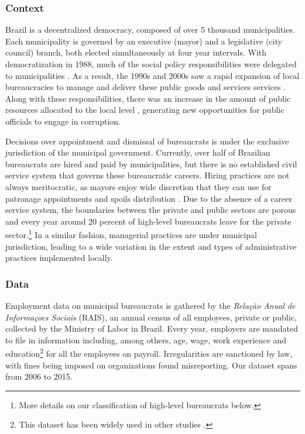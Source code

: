 \subsubsection*{Context}

Brazil is a decentralized democracy, composed of over 5 thousand municipalities. Each municipality is governed by an executive (mayor) and a legislative (city council) branch, both elected simultaneously at four year intervals. With democratization in 1988, much of the social policy responsibilities were delegated to  municipalities \citep{abrucio_redefinicao_1996}. As a result, the 1990s and 2000s saw a rapid expansion of local bureaucracies to manage and deliver these public goods and services services \citep{cardoso_jr_burocracia_2011}. Along with these responsibilities, there was an increase in the amount of public resources allocated to the local level \citep{arretche_trajetorias_2015}, generating new opportunities for public officials to engage in corruption.

Decisions over appointment and dismissal of bureaucrats is under the exclusive jurisdiction of the municipal government.  Currently, over half of Brazilian bureaucrats are hired and paid by municipalities, but there is no established civil service system that governs these bureaucratic careers. Hiring practices are not always meritocratic, as mayors enjoy wide discretion that they can use for patronage appointments and spoils distribution \citep{brollo_victor_2017, colonnelli_patronage_2017}. Due to the absence of a career service system, the boundaries between the private and public sectors are porous and every year around 20 percent of high-level bureaucrats leave for the private sector.\footnote{More details on our classification of high-level bureaucrats below.} In a similar fashion, managerial practices are under municipal jurisdiction, leading to a wide variation in the extent and types of administrative practices implemented locally.

\subsubsection*{Data}

Employment data on municipal bureaucrats is gathered by the \emph{Relação Anual de Informaçoes Sociais} (RAIS), an annual census of all employees, private or public, collected by the Ministry of Labor in Brazil. Every year, employers are mandated to file in information including, among others, age, wage, work experience and education\footnote{This dataset has been widely used in other studies \citep[e.g.][]{colonnelli_patronage_2017, brollo_victor_2017}.} for all the employees on payroll. Irregularities are sanctioned by law, with fines being imposed on organizations found misreporting. Our dataset spans from 2006 to 2015. 

